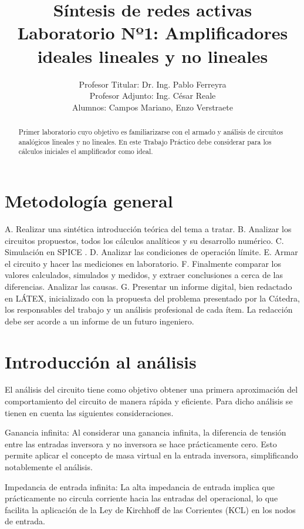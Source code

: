 \documentclass[12pt]{article}
\title{Síntesis de redes activas \\ Laboratorio Nº1: Amplificadores ideales lineales y no lineales}
\author{Profesor Titular: Dr. Ing. Pablo Ferreyra \\  Profesor Adjunto: Ing. César Reale \\ Alumnos: Campos Mariano, 
		Enzo Verstraete}
\begin{document}
	\maketitle
	
	\begin{abstract}
		Primer laboratorio cuyo objetivo es familiarizarse con el armado y análisis de circuitos analógicos
		lineales y no lineales. En este Trabajo Práctico debe considerar para los cálculos iniciales el 
		amplificador como ideal.
	\end{abstract}\newpage
	
	
	\section{Metodología general}	
		A. Realizar una sintética introducción teórica del tema a tratar.
		B. Analizar los circuitos propuestos, todos los cálculos analíticos y su desarrollo numérico.
		C. Simulación en SPICE .
		D. Analizar las condiciones de operación límite.
		E. Armar el circuito y hacer las mediciones en laboratorio.
		F. Finalmente comparar los valores calculados, simulados y medidos, y extraer conclusiones a
		cerca de las diferencias. Analizar las causas.
		G. Presentar un informe digital, bien redactado en LÁTEX, inicializado con la propuesta del
		problema presentado por la Cátedra, los responsables del trabajo y un análisis profesional de
		cada ítem. La redacción debe ser acorde a un informe de un futuro ingeniero.
	
	\section{Introducción al análisis}
	
	El análisis del	circuito tiene como objetivo obtener una primera aproximación del comportamiento
	del circuito de manera rápida y eficiente. Para dicho análisis se tienen en cuenta las siguientes
	consideraciones.
	
	Ganancia infinita: Al considerar una ganancia infinita, la diferencia de tensión entre las entradas inversora y no inversora se hace prácticamente cero. Esto permite aplicar el concepto de masa virtual en la entrada inversora, simplificando notablemente el análisis.
	
	Impedancia de entrada infinita: La alta impedancia de entrada implica que prácticamente no circula corriente hacia las entradas del operacional, lo que facilita la aplicación de la Ley de Kirchhoff de las Corrientes (KCL) en los nodos de entrada.
	
\end{document}
